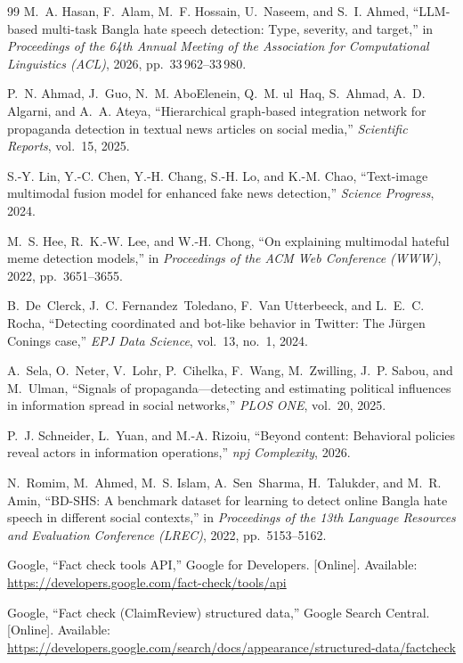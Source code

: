 \documentclass[12pt,a4paper]{report}
\begin{document}
\begin{thebibliography}{99}
 M.~A. Hasan, F.~Alam, M.~F. Hossain, U.~Naseem, and S.~I. Ahmed, ``LLM-based multi-task Bangla hate speech detection: Type, severity, and target,'' in \emph{Proceedings of the 64th Annual Meeting of the Association for Computational Linguistics (ACL)}, 2026, pp.~33\,962--33\,980.

 P.~N. Ahmad, J.~Guo, N.~M. AboElenein, Q.~M. ul~Haq, S.~Ahmad, A.~D. Algarni, and A.~A. Ateya, ``Hierarchical graph-based integration network for propaganda detection in textual news articles on social media,'' \emph{Scientific Reports}, vol.~15, 2025.

 S.-Y. Lin, Y.-C. Chen, Y.-H. Chang, S.-H. Lo, and K.-M. Chao, ``Text-image multimodal fusion model for enhanced fake news detection,'' \emph{Science Progress}, 2024.

 M.~S. Hee, R.~K.-W. Lee, and W.-H. Chong, ``On explaining multimodal hateful meme detection models,'' in \emph{Proceedings of the ACM Web Conference (WWW)}, 2022, pp.~3651--3655.

 B.~De~Clerck, J.~C. Fernandez~Toledano, F.~Van Utterbeeck, and L.~E.~C. Rocha, ``Detecting coordinated and bot-like behavior in Twitter: The J\"urgen Conings case,'' \emph{EPJ Data Science}, vol.~13, no.~1, 2024.

 A.~Sela, O.~Neter, V.~Lohr, P.~Cihelka, F.~Wang, M.~Zwilling, J.~P. Sabou, and M.~Ulman, ``Signals of propaganda---detecting and estimating political influences in information spread in social networks,'' \emph{PLOS ONE}, vol.~20, 2025.

 P.~J. Schneider, L.~Yuan, and M.-A. Rizoiu, ``Beyond content: Behavioral policies reveal actors in information operations,'' \emph{npj Complexity}, 2026.

 N.~Romim, M.~Ahmed, M.~S. Islam, A.~Sen~Sharma, H.~Talukder, and M.~R. Amin, ``BD-SHS: A benchmark dataset for learning to detect online Bangla hate speech in different social contexts,'' in \emph{Proceedings of the 13th Language Resources and Evaluation Conference (LREC)}, 2022, pp.~5153--5162.

 Google, ``Fact check tools API,'' Google for Developers. [Online]. Available: \url{https://developers.google.com/fact-check/tools/api}

 Google, ``Fact check (ClaimReview) structured data,'' Google Search Central. [Online]. Available: \url{https://developers.google.com/search/docs/appearance/structured-data/factcheck}


\end{thebibliography}
\end{document}
